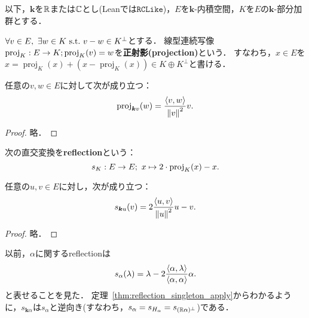 以下，$\bm{k}$を$\mathbb{R}$または$\mathbb{C}$とし(Leanでは$\mathtt{RCLike}$)，$E$を$\bm{k}$-内積空間，$K$を$E$の$\bm{k}$-部分加群とする．

\begin{defi}
  \label{defi:orthogonalProjection}
  \leanok
  $\forall v \in E,\ \exists w \in K \ \text{s.t.}\  v - w \in K^\perp$とする．
  線型連続写像$\operatorname{proj}_K : E \rightarrow K; \operatorname{proj}_K(v) = w$を\textbf{正射影(projection)}という．
  すなわち，$x \in E$を$x = \operatorname{proj}_K(x) + (x - \operatorname{proj}_K(x)) \in K \oplus K^\perp$と書ける．
\end{defi}

\begin{thm}
  \label{thm:orthogonalProjection_singleton}
  \leanok
  任意の$v, w \in E$に対して次が成り立つ：
  \begin{equation}
    \operatorname{proj}_{\bm{k}v}(w) = \frac{\left\langle v, w \right\rangle}{\left\| v \right\|^2} v.
  \end{equation}
\end{thm}

\begin{proof}
  \leanok
  略．
\end{proof}

\begin{defi}
  \label{defi:reflection}
  \leanok
  次の直交変換を\textbf{reflection}という：
  \begin{equation}
    s_K : E \rightarrow E;\ x \mapsto 2 \cdot \operatorname{proj}_K(x) - x.
  \end{equation}
\end{defi}

\begin{thm}
  \label{thm:reflection_singleton_apply}
  \leanok
  任意の$u, v \in E$に対し，次が成り立つ：
  \begin{equation}
    s_{\bm{k}u}(v) = 2 \frac{\left\langle u, v \right\rangle}{\left\| u \right\|^2}u - v.
  \end{equation}
\end{thm}

\begin{proof}
  \leanok
  略．
\end{proof}

\begin{rem}
  以前，$\alpha$に関するreflectionは
  \begin{equation}
    s_\alpha (\lambda) = \lambda - 2\frac{\left\langle \alpha, \lambda \right\rangle}{\left\langle \alpha, \alpha \right\rangle} \alpha.
  \end{equation}
  と表せることを見た．
  定理~\ref{thm:reflection_singleton_apply}からわかるように，$s_{\bm{k}\alpha}$は$s_\alpha$と逆向き(すなわち，$s_\alpha = s_{H_\alpha} = s_{(\mathbb{R} \alpha)^\perp}$)である．
\end{rem}

